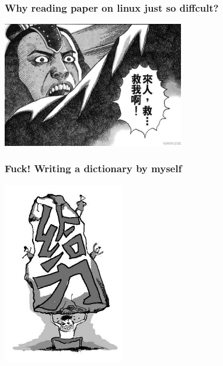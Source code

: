 \documentclass[10pt]{beamer}
\begin{document}
\begin{frame}
  \frametitle{\Large{Why reading paper on linux just so diffcult?}}

\begin{center} 
  \includegraphics[width=0.6\textwidth]{help.jpg}
\end{center}

\end{frame}

\begin{frame}
  \frametitle{\Large{Fuck! Writing a dictionary by myself}}
 
\begin{center} 
  \includegraphics[width=0.4\textwidth]{geili.jpg}
  
\end{center}

\end{frame}
\end{document}
